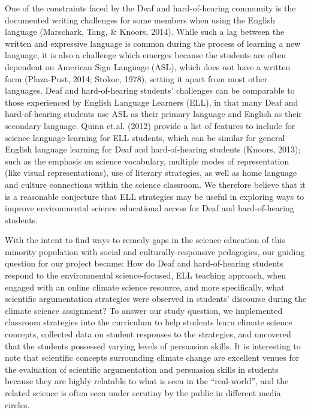 \documentclass[11.5pt]{sig-alternate} %
\begin{document}
\begin{large}
One of the constraints faced by the Deaf and hard-of-hearing community is the documented writing challenges for some members when using the English language (Marschark, Tang, \& Knoors, 2014). While such a lag between the written and expressive language is common during the process of learning a new language, it is also a challenge which emerges because the students are often dependent on American Sign Language (ASL), which does not have a written form (Plaza-Pust, 2014; Stokoe, 1978), setting it apart from most other languages. Deaf and hard-of-hearing students’ challenges can be comparable to those experienced by English Language Learners (ELL), in that many Deaf and hard-of-hearing students use ASL as their primary language and English as their secondary language. Quinn et.al. (2012) provide a list of features to include for science language learning for ELL students, which can be similar for general English language learning for Deaf and hard-of-hearing students (Knoors, 2013); such as the emphasis on science vocabulary, multiple modes of representation (like visual representations), use of literary strategies, as well as home language and culture connections within the science classroom. We therefore believe that it is a reasonable conjecture that ELL strategies may be useful in exploring ways to improve environmental science educational access for Deaf and hard-of-hearing students. 

With the intent to find ways to remedy gaps in the science education of this minority population with social and culturally-responsive pedagogies, our guiding question for our project became: How do Deaf and hard-of-hearing students respond to the environmental science-focused, ELL teaching approach, when engaged with an online climate science resource, and more specifically, what scientific argumentation strategies were observed in students’ discourse during the climate science assignment? To answer our study question, we implemented classroom strategies into the curriculum to help students learn climate science concepts, collected data on student responses to the strategies, and uncovered that the students possessed varying levels of persuasion skills. It is interesting to note that scientific concepts surrounding climate change are excellent venues for the evaluation of scientific argumentation and persuasion skills in students because they are highly relatable to what is seen in the “real-world”, and the related science is often seen under scrutiny by the public in different media circles. 


\end{large}
\end{document}

